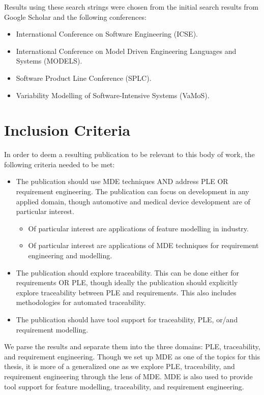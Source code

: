 Results using these search strings were chosen from the initial search results from Google Scholar and the following conferences:
\begin{itemize}
	\item International Conference on Software Engineering (ICSE). 
	\item International Conference on Model Driven Engineering Languages and Systems (MODELS). 
	\item Software Product Line Conference (SPLC).
	\item Variability Modelling of Software-Intensive Systems (VaMoS).
\end{itemize}

\section{Inclusion Criteria}

In order to deem a resulting publication to be relevant to this body of work, the following criteria needed to be met:
\begin{itemize}
	\item The publication should use \gls{MDE} techniques AND address \gls{PLE} OR requirement engineering. The publication can focus on development in any applied domain, though automotive and medical device development are of particular interest. 
	\begin{itemize}
		\item Of particular interest are applications of feature modelling in industry. 
		\item Of particular interest are applications of \gls{MDE} techniques for requirement engineering and modelling.
	\end{itemize}
	\item The publication should explore traceability. This can be done either for requirements OR \gls{PLE}, though ideally the publication should explicitly explore traceability between \gls{PLE} and requirements. This also includes methodologies for automated traceability.
	\item The publication should have tool support for traceability, \gls{PLE}, or/and requirement modelling. 
\end{itemize}

We parse the results and separate them into the three domains: \gls{PLE}, traceability, and requirement engineering. Though we set up \gls{MDE} as one of the topics for this thesis, it is more of a generalized one as we explore \gls{PLE}, traceability, and requirement engineering through the lens of \gls{MDE}. \gls{MDE} is also used to provide tool support for feature modelling, traceability, and requirement engineering.

